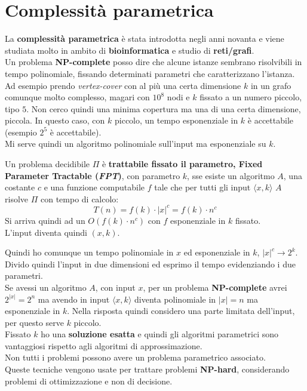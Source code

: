														\section{Complessità parametrica}
														La \textbf{complessità parametrica} è stata introdotta negli anni novanta e
														viene studiata molto in ambito di \textbf{bioinformatica} e studio di
														\textbf{reti/grafi}.\\
														Un problema \textbf{NP-complete} posso dire che alcune istanze sembrano
														risolvibili in tempo polinomiale, fissando determinati parametri che
														caratterizzano l'istanza. Ad esempio prendo \textit{vertex-cover} con al più una
														certa dimensione $k$ in un grafo comunque molto complesso, magari con $10^8$
														nodi e $k$ fissato a un numero piccolo, tipo $5$. Non cerco quindi una minima
														copertura ma una di una certa dimensione, piccola. In questo caso, con $k$
														piccolo, un tempo esponenziale in $k$ è accettabile (esempio $2^5$ è
														accettabile).\\
														Mi serve quindi un algoritmo polinomiale sull'input ma esponenziale su $k$.
														\begin{definizione}
															Un problema decidibile $\Pi$ è \textbf{trattabile fissato il parametro, Fixed
																Parameter Tractable (\textit{FPT})}, con parametro $k$, sse esiste un
															algoritmo $A$, una costante $c$ e una funzione computabile $f$ tale che per
															tutti gli input $\langle x,k\rangle$ $A$ risolve $\Pi$ con tempo di calcolo:
															\[T(n) = f(k)\cdot|x|^c=f(k)\cdot n^c\]
															Si arriva quindi ad un $O(f(k)\cdot n^c)$ con $f$ esponenziale in $k$
															fissato. \\
															L'input diventa quindi $(x,k)$.
														\end{definizione}
														Quindi ho comunque un tempo polinomiale in $x$ ed esponenziale in $k$, $|x|^c\to
														2^k$. Divido quindi l'input in due dimensioni ed esprimo il tempo evidenziando
														i due parametri.\\
														Se avessi un algoritmo $A$, con input $x$, per un problema \textbf{NP-complete}
														avrei $2^{|x|}=2^n$ ma avendo in input $\langle x,k\rangle$ diventa polinomiale
														in $|x|=n$ ma esponenziale in $k$. Nella risposta quindi considero una parte
														limitata dell'input, per questo serve $k$ piccolo.\\
														Fissato $k$ ho una \textbf{soluzione esatta} e quindi gli algoritmi parametrici
														sono vantaggiosi rispetto agli algoritmi di approssimazione.\\
														Non tutti i problemi possono avere un problema parametrico associato.\\
														Queste tecniche vengono usate per trattare problemi \textbf{NP-hard},
														considerando problemi di ottimizzazione e non di decisione.
